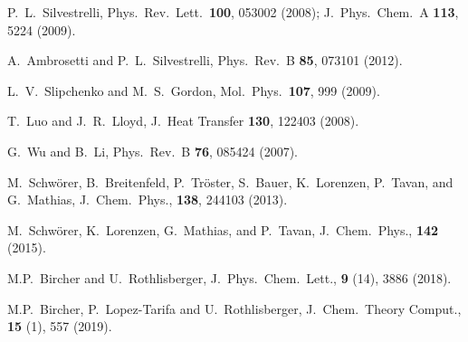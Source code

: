 \documentclass[twoside,10pt,titlepage,a4paper]{article}
\begin{document}
\begin{thebibliography}{999}
      P.~L.~Silvestrelli, Phys.~Rev.~Lett.~{\bf 100}, 053002 (2008);
       J.~Phys.~Chem.~A {\bf 113}, 5224 (2009).

     A.~Ambrosetti and P.~L.~Silvestrelli, Phys.~Rev.~B {\bf 85}, 073101 (2012).

     L.~V.~Slipchenko and M.~S.~Gordon, 
     Mol.~Phys.~{\bf 107}, 999 (2009).

    T.~Luo and J.~R.~Lloyd, J.~Heat Transfer {\bf 130}, 122403 (2008).

    G.~Wu and B.~Li, Phys.~Rev.~B {\bf 76}, 085424 (2007).

M.~Schw\"{o}rer, B.~Breitenfeld, P.~Tr\"{o}ster, S.~Bauer, K.~Lorenzen, P.~Tavan, and G.~Mathias,
 J.\ Chem.\ Phys., {\bf 138},  244103  (2013).

M.~Schw\"{o}rer, K.~Lorenzen, G.~Mathias, and P.~Tavan,
 J.\ Chem.\ Phys., {\bf 142}   (2015).

M.P.~Bircher and U.~Rothlisberger,
 J.\ Phys.\ Chem.\ Lett., {\bf 9} (14), 3886 (2018).

M.P.~Bircher, P.~Lopez-Tarifa and U.~Rothlisberger,
 J.\ Chem.\ Theory Comput., {\bf 15} (1), 557 (2019).



\end{thebibliography}
%

%
%
\cleardoublepage

\renewenvironment{theindex}%
{\newpage%
\section*{Index}%
\addcontentsline{toc}{section}{Index}%
\begin{multicols}{2}%
\par\bigskip%
\begin{list}%
{}%
{%
\setlength{\leftmargin}{3em}
\setlength{\itemindent}{0pt}
\setlength{\parsep}{0pt}
\setlength{\itemsep}{0pt}
\setlength{\itemindent}{-3em}}
}%
{\end{list}\end{multicols}}%

\printindex

%
\end{document}
